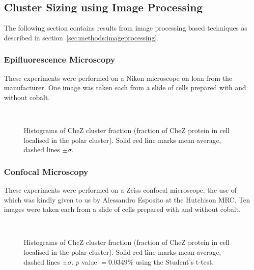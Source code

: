 \documentclass[../main.tex]{subfiles}
\begin{document}
\newpage
\subsection{Cluster Sizing using Image Processing}

The following section contains results from image processing based techniques as described in section~\ref{sec:methods:imageprocessing}.

\subsubsection{Epifluorescence Microscopy}
\label{sec:results:cs:epi}

These experiments were performed on a Nikon microscope on loan from the manufacturer. One image was taken each from a slide of cells prepared with and without cobalt.

\begin{figure}[h!]
\begin{center}
\\
\caption[Image processing results on Nikon microscope]{Histograms of CheZ cluster fraction (fraction of CheZ protein in cell localised in the polar cluster). Solid red line marks mean average, dashed lines \(\pm\sigma\).}
\label{fig:results:nikon}
\end{center}
\end{figure}

\subsubsection{Confocal Microscopy}
\label{sec:results:cs:confocal}
These experiments were performed on a Zeiss confocal microscope, the use of which was kindly given to us by Alessandro Esposito at the Hutchison MRC. Ten images were taken each from a slide of cells prepared with and without cobalt.

\begin{figure}[h!]
\begin{center}
\\
\caption[Image processing results on Zeiss confocal microscope]{Histograms of CheZ cluster fraction (fraction of CheZ protein in cell localised in the polar cluster). Solid red line marks mean average, dashed lines \(\pm\sigma\). \(p\) value \(=0.0349\%\) using the Student's t-test.}
\label{fig:results:zeiss}
\end{center}
\end{figure}
\newpage
\end{document}
